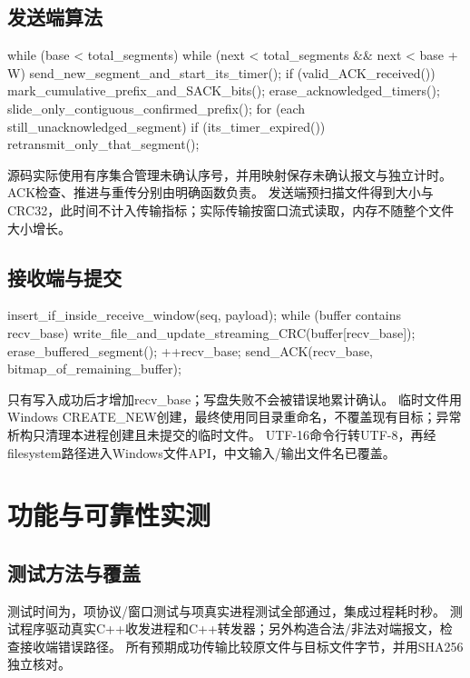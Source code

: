 \documentclass[UTF8,notitlepage,11pt]{ctexart}
\begin{document}
\subsection{发送端算法}
\begin{code}
while (base < total_segments) {
    while (next < total_segments && next < base + W)
        send_new_segment_and_start_its_timer();
    if (valid_ACK_received()) {
        mark_cumulative_prefix_and_SACK_bits();
        erase_acknowledged_timers();
        slide_only_contiguous_confirmed_prefix();
    }
    for (each still_unacknowledged_segment)
        if (its_timer_expired()) retransmit_only_that_segment();
}
\end{code}
源码实际使用有序集合管理未确认序号，并用映射保存未确认报文与独立计时。ACK检查、推进与重传分别由明确函数负责。
发送端预扫描文件得到大小与CRC32，此时间不计入传输指标；实际传输按窗口流式读取，内存不随整个文件大小增长。

\noindent\begin{minipage}{\textwidth}
\subsection{接收端与提交}
\begin{code}
insert_if_inside_receive_window(seq, payload);
while (buffer contains recv_base) {
    write_file_and_update_streaming_CRC(buffer[recv_base]);
    erase_buffered_segment();
    ++recv_base;
}
send_ACK(recv_base, bitmap_of_remaining_buffer);
\end{code}
只有写入成功后才增加recv\_base；写盘失败不会被错误地累计确认。
临时文件用Windows CREATE\_NEW创建，最终使用同目录重命名，不覆盖现有目标；异常析构只清理本进程创建且未提交的临时文件。
UTF-16命令行转UTF-8，再经filesystem路径进入Windows文件API，中文输入/输出文件名已覆盖。
\end{minipage}

\section{功能与可靠性实测}
\subsection{测试方法与覆盖}
测试时间为\TestTimestamp{}，\UnitCount{}项协议/窗口测试与\IntegrationCount{}项真实进程测试全部通过，集成过程耗时\TestTime{}秒。
测试程序驱动真实C++收发进程和C++转发器；另外构造合法/非法对端报文，检查接收端错误路径。
所有预期成功传输比较原文件与目标文件字节，并用SHA256独立核对。
\end{document}
